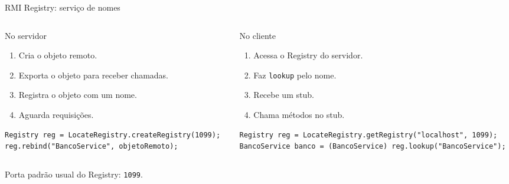 \documentclass[aspectratio=169]{beamer}
\newcommand{\code}[1]{\texttt{#1}}
\begin{document}
\begin{frame}[fragile]{RMI Registry: serviço de nomes}
    \begin{columns}[T]
        \begin{column}{0.48\textwidth}
            \begin{block}{No servidor}
                \begin{enumerate}
                    \item Cria o objeto remoto.
                    \item Exporta o objeto para receber chamadas.
                    \item Registra o objeto com um nome.
                    \item Aguarda requisições.
                \end{enumerate}
            \end{block}

            \begin{lstlisting}[basicstyle=\ttfamily\tiny]
Registry reg = LocateRegistry.createRegistry(1099);
reg.rebind("BancoService", objetoRemoto);
            \end{lstlisting}
        \end{column}

        \begin{column}{0.48\textwidth}
            \begin{block}{No cliente}
                \begin{enumerate}
                    \item Acessa o Registry do servidor.
                    \item Faz \code{lookup} pelo nome.
                    \item Recebe um stub.
                    \item Chama métodos no stub.
                \end{enumerate}
            \end{block}

            \begin{lstlisting}[basicstyle=\ttfamily\tiny]
Registry reg = LocateRegistry.getRegistry("localhost", 1099);
BancoService banco = (BancoService) reg.lookup("BancoService");
            \end{lstlisting}
        \end{column}
    \end{columns}

    \vspace{0.2cm}
    \centering
    \small Porta padrão usual do Registry: \code{1099}.
\end{frame}
\end{document}
